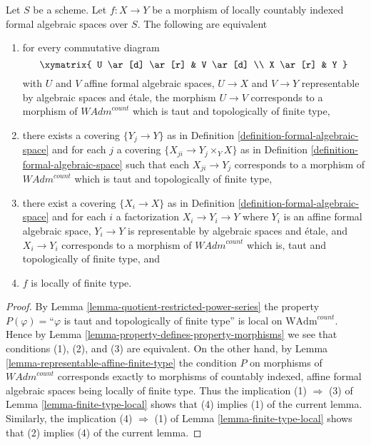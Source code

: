 \begin{lemma}
\label{lemma-finite-type-local-property}
Let $S$ be a scheme. Let $f : X \to Y$ be a morphism of
locally countably indexed formal algebraic spaces over $S$.
The following are equivalent
\begin{enumerate}
\item for every commutative diagram
$$
\xymatrix{
U \ar[d] \ar[r] & V \ar[d] \\
X \ar[r] & Y
}
$$
with $U$ and $V$ affine formal algebraic spaces, $U \to X$ and $V \to Y$
representable by algebraic spaces and \'etale, the morphism $U \to V$
corresponds to a morphism of $\textit{WAdm}^{count}$ which is
taut and topologically of finite type,
\item there exists a covering $\{Y_j \to Y\}$ as in
Definition \ref{definition-formal-algebraic-space} and for each $j$
a covering $\{X_{ji} \to Y_j \times_Y X\}$ as in
Definition \ref{definition-formal-algebraic-space}
such that each $X_{ji} \to Y_j$  corresponds
to a morphism of $\textit{WAdm}^{count}$ which is
taut and topologically of finite type,
\item there exist a covering $\{X_i \to X\}$ as in
Definition \ref{definition-formal-algebraic-space}
and for each $i$ a factorization $X_i \to Y_i \to Y$ where $Y_i$
is an affine formal algebraic space, $Y_i \to Y$ is representable
by algebraic spaces and \'etale, and $X_i \to Y_i$ corresponds
to a morphism of $\textit{WAdm}^{count}$ which is,
taut and topologically of finite type, and
\item $f$ is locally of finite type.
\end{enumerate}
\end{lemma}

\begin{proof}
By Lemma \ref{lemma-quotient-restricted-power-series}
the property
$P(\varphi)=$``$\varphi$ is taut and topologically of finite type''
is local on $\text{WAdm}^{count}$. Hence by
Lemma \ref{lemma-property-defines-property-morphisms}
we see that conditions (1), (2), and (3) are equivalent.
On the other hand, by Lemma \ref{lemma-representable-affine-finite-type}
the condition $P$ on morphisms of $\textit{WAdm}^{count}$
corresponds exactly to morphisms of countably indexed, affine
formal algebraic spaces being locally of finite type.
Thus the implication (1) $\Rightarrow$ (3) of
Lemma \ref{lemma-finite-type-local}
shows that (4) implies (1) of the current lemma.
Similarly, the implication (4) $\Rightarrow$ (1) of
Lemma \ref{lemma-finite-type-local}
shows that (2) implies (4) of the current lemma.
\end{proof}







